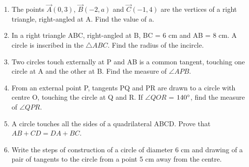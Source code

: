 \documentclass{article}
\begin{document}
\begin{enumerate}
        \item The points $\vec{A}(0, 3)$, $\vec{B}(-2, a)$ and $\vec{C}(-1, 4)$ are the vertices of a right triangle, right-angled at A. Find the value of a. 
		
        \item In a right triangle ABC, right-angled at B, BC = 6 cm and AB = 8 cm. A circle is inscribed in the $\triangle ABC$. Find the radius of the incircle. 
			
        \item Two circles touch externally at P and AB is a common tangent, touching one circle at A and the other at B. Find the measure of $\angle APB$.

		\item From an external point P, tangents PQ and PR are drawn to a circle with centre O, touching the circle at Q and R. If $\angle QOR$ = $140\degree$, find the measure of $\angle QPR$. 

		\item A circle touches all the sides of a quadrilateral ABCD. Prove that $AB + CD = DA + BC$.

		\item Write the steps of construction of a circle of diameter 6 cm and drawing of a pair of tangents to the circle from a point 5 cm away from the centre. 
		
	\end{enumerate}	
\end{document}
